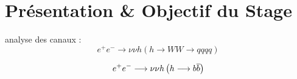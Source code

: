 
\section{Présentation \& Objectif du Stage}

analyse des canaux :
\begin{equation}
	e^{+} e^{-} \longrightarrow \nu \nu h \left(h \longrightarrow WW \longrightarrow qqqq \right)
\end{equation}

\begin{equation}
	e^{+} e^{-} \longrightarrow \nu \nu h \left(h \longrightarrow b \overline{b} \right)
\end{equation}